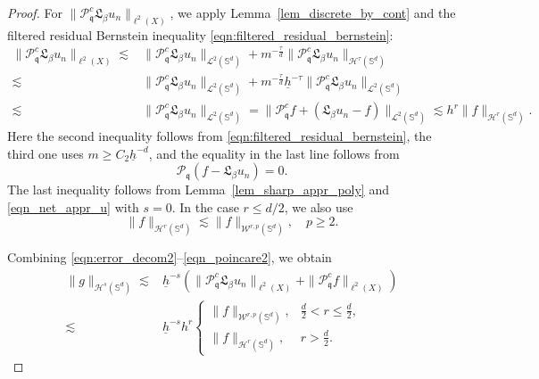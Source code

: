 \documentclass[10pt,a4paper]{amsart}
\def\SS{\mathbb{S}}
\def\mq{\mathfrak{q}}
\def\pc{\mathcal{P}^c}
\begin{document}
\begin{proof}
\medskip
For $\|\pc_\mq\mathfrak L_\beta u_n\|_{\ell^2(X)}$, we apply Lemma~\ref{lem_discrete_by_cont} and the filtered residual Bernstein inequality \eqref{eqn:filtered_residual_bernstein}:
\begin{equation}\label{eqn_poincare2}
    \begin{split}
        \|\pc_\mq\mathfrak L_\beta u_n\|_{\ell^2(X)}
        \lesssim&\|\pc_\mq\mathfrak L_\beta u_n\|_{\mathcal L^2(\SS^d)}
        +m^{-\frac{\tau}{d}}\|\pc_\mq\mathfrak L_\beta u_n\|_{\mathcal H^\tau(\SS^d)}\\
        \lesssim&\|\pc_\mq\mathfrak L_\beta u_n\|_{\mathcal L^2(\SS^d)}
        +m^{-\frac{\tau}{d}}\underline h^{-\tau}
        \|\pc_\mq\mathfrak L_\beta u_n\|_{\mathcal L^2(\SS^d)}\\
        \lesssim&\|\pc_\mq\mathfrak L_\beta u_n\|_{\mathcal L^2(\SS^d)}=\|\pc_\mq f+(\mathfrak L_\beta u_n-f)\|_{\mathcal L^2(\SS^d)}
        \lesssim h^r\|f\|_{\mathcal H^r(\SS^d)}.
    \end{split}
\end{equation}
Here the second inequality follows from \eqref{eqn:filtered_residual_bernstein}, the third one uses $m\geq C_2\underline h^{-d}$, and the equality in the last line follows from
\begin{equation*}
    \mathcal P_\mq(f-\mathfrak L_\beta u_n)=0.
\end{equation*}
The last inequality follows from Lemma~\ref{lem_sharp_appr_poly} and \eqref{eqn_net_appr_u} with $s=0$. In the case $r\leq d/2$, we also use
\begin{equation*}
    \|f\|_{\mathcal H^r(\SS^d)}\lesssim\|f\|_{\mathcal W^{r,p}(\SS^d)},\quad p\geq2.
\end{equation*}

\medskip
Combining \eqref{eqn:error_decom2}--\eqref{eqn_poincare2}, we obtain
\begin{equation}
    \begin{split}
        \|g\|_{\mathcal H^s(\SS^d)}
        \lesssim&\underline h^{-s}\left(\|\pc_\mq\mathfrak L_\beta u_n\|_{\ell^2(X)}
        +\|\pc_\mq f\|_{\ell^2(X)}\right)\\
        \lesssim&\underline h^{-s}h^r
        \left\{\begin{array}{ll}
            \|f\|_{\mathcal W^{r,p}(\SS^d)},&\frac{d}{2}<r\leq\frac d2,\\[0.3em]
            \|f\|_{\mathcal H^r(\SS^d)},&r>\frac d2.
        \end{array}\right.
    \end{split}
\end{equation}


\end{proof}
\end{document}
